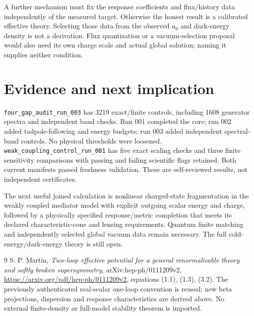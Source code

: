\documentclass[11pt]{article}
\begin{document}
A further mechanism must fix the response coefficients and flux/history
data independently of the measured target. Otherwise the honest result
is a calibrated effective theory. Selecting those data from the observed
$a_0$ and dark-energy density is not a derivation. Flux quantization or a
vacuum-selection proposal would also need its own charge scale and actual
global solution; naming it supplies neither condition.

\section{Evidence and next implication}
\texttt{four\_gap\_audit\_run\_003} has 3219 exact/finite controls,
including 1608 generator spectra and independent band checks. Run 001
completed the core; run 002 added tadpole-following and energy budgets;
run 003 added independent spectral-band controls. No physical thresholds
were loosened. \texttt{weak\_coupling\_control\_run\_001} has five exact
scaling checks and three finite sensitivity comparisons with passing and
failing scientific flags retained. Both current manifests passed freshness
validation. These are self-reviewed results, not independent certificates.

The next useful joined calculation is nonlinear charged-state fragmentation
in the weakly coupled mediator model with explicit outgoing scalar energy
and charge, followed by a physically specified response/metric completion
that meets its declared characteristic-cone and lensing requirements.
Quantum finite matching and independently selected global vacuum data
remain necessary. The full cold-energy/dark-energy theory is still open.

\begin{thebibliography}{9}
 S. P. Martin,
\emph{Two-loop effective potential for a general renormalizable theory and
softly broken supersymmetry}, arXiv:hep-ph/0111209v2,
\url{https://arxiv.org/pdf/hep-ph/0111209v2}, equations (1.1), (1.3), (3.2).
The previously authenticated real-scalar one-loop convention is reused;
new beta projections, dispersion and response characteristics are derived
above. No external finite-density or full-model stability theorem is imported.
\end{thebibliography}
\end{document}
